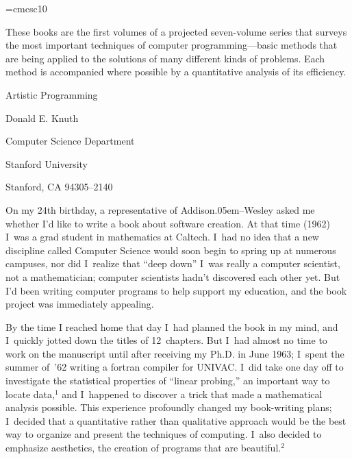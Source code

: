 \magnification{}
\font\sc=cmcsc10 %
\parindent0pt
\def\bib{\par\noindent\hangindent 20pt}
\def\TeX{T\hbox{\hskip-.1667em\lower.424ex\hbox{E}\hskip-.125em X}}

\advance\baselineskip6pt
\advance\parskip6pt


\bigskip
These books are the first volumes of a projected seven-volume series
that surveys the most important techniques of computer
programming---basic methods that are being applied to the solutions of
many different kinds of problems. Each method is accompanied where
possible by a quantitative analysis of its efficiency.

\bigskip
\centerline{Artistic Programming}
\medskip
\centerline{Donald E. Knuth}
\centerline{Computer Science Department}
\centerline{Stanford University}
\centerline{Stanford, CA 94305--2140}

\bigskip
On my 24th birthday, a representative of Addison\kern.05em--Wesley
asked me whether I'd like to write a book about software creation. At
that time (1962) I~was a grad student in mathematics at Caltech. I~had
no idea that a new discipline called Computer Science would soon begin
to spring up at numerous campuses, nor did I~realize that
``deep down'' I~was really a computer scientist, not a mathematician;
computer scientists hadn't discovered each other yet. But I'd been
writing computer programs to help support my education, and the book
project was immediately appealing.

By the time I reached home that day I~had planned the book in my mind,
and I~quickly jotted down the titles of 12~chapters. But I~had almost
no time to work on the manuscript until after receiving my Ph.D. in
June 1963; I~spent the summer of~'62 writing a {\sc fortran} compiler
for UNIVAC. I~did take one day off to investigate the statistical
properties of ``linear probing,'' an important way to locate data,$^1$
and I~happened to discover a trick that made a mathematical analysis
possible. This experience profoundly changed my book-writing plans;
I~decided that a quantitative rather than qualitative approach would
be the best way to organize and present the techniques of computing.
I~also decided to emphasize aesthetics, the creation of programs that
are beautiful.$^2$

